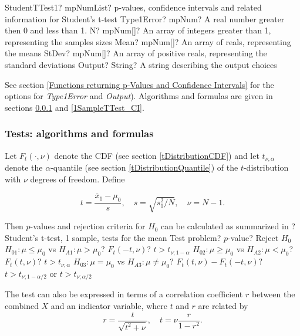 \begin{mpFunctionsExtract}
	\mpFunctionFiveNotImplemented
	{StudentTTest1? mpNumList? p-values, confidence intervals and related information for Student's t-test}
	{Type1Error? mpNum? A real number greater then 0 and less than 1.}
	{N? mpNum[]? An array of integers greater than 1, representing the samples sizes}
	{Mean? mpNum[]? An array of reals, representing the means}
	{StDev? mpNum[]? An array of positive reals, representing the standard deviations}
	{Output? String? A string describing the output choices}
\end{mpFunctionsExtract}

\vspace{0.3cm}
See section \ref{Functions returning p-Values and Confidence Intervals} for the options for {\itshape\sffamily Type1Error} and {\itshape\sffamily Output}). Algorithms and formulas are given in sections \ref{1SampleTTest_Test} and \ref{1SampleTTest_CI}.



\subsubsection{Tests: algorithms and formulas}
\label{1SampleTTest_Test}
Let $F_t\left(\cdot, \nu\right)$ denote the CDF (see section \ref{tDistributionCDF}) and let $t_{\nu,\alpha}$ denote the $\alpha$-quantile (see section \ref{tDistributionQuantile}) of the $t$-distribution with $\nu$ degrees of freedom. Define

\begin{equation} \label{eq:TTest1}
	t= \frac{\overline{x}_1-\mu_0}{s}, \quad s=\sqrt{s_1^2 /N}, \quad \nu=N-1.
\end{equation}


\mpTableThreeColsThreeRows
{Then $p$-values and rejection criteria for $H_0$ can be calculated as summarized in ? Student's t-test, 1 sample, tests for the mean}
{Test problem? $p$-value? Reject $H_0$}
{$H_{01}: \mu \leq \mu_0$ vs $H_{A1}: \mu > \mu_0$? $F_t\left(-t, \nu\right)$? $t > t_{\nu;1-\alpha}$}
{$H_{02}: \mu \geq \mu_0$ vs $H_{A2}: \mu < \mu_0$? $F_t\left(t, \nu\right)$? $t > t_{\nu;\alpha}$}
{$H_{03}: \mu = \mu_0$ vs $H_{A3}: \mu \neq \mu_0$? $F_t\left(t, \nu\right)-F_t\left(-t, \nu\right)$? $t > t_{\nu;1-\alpha/2}$ or $t > t_{\nu;\alpha/2}$}



The test can also be expressed in terms of a correlation coefficient $r$ between the combined $X$ and an indicator variable, where $t$ and $r$ are related by
\begin{equation}
	r=\frac{t}{\sqrt{t^2+\nu}}, \quad t= \nu \frac{r}{1-r^2}.
\end{equation}


